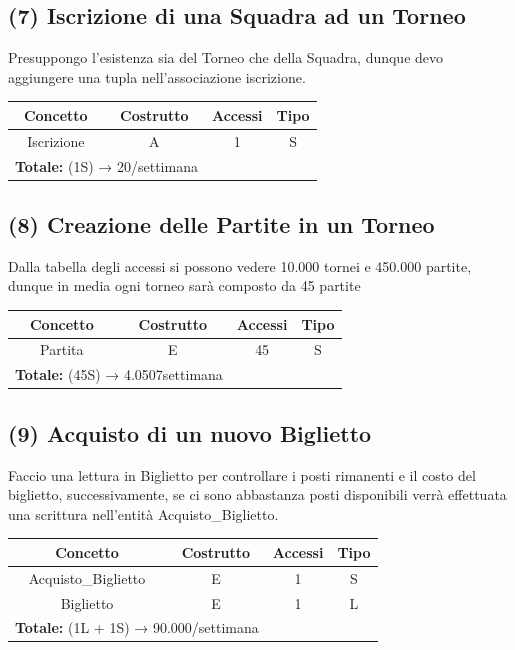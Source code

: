 \documentclass[a4paper,12pt]{report}
\begin{document}
\subsection*{(7) Iscrizione di una Squadra ad un Torneo}
Presuppongo l'esistenza sia del Torneo che della Squadra, dunque devo aggiungere una tupla nell'associazione iscrizione.
\begin{center}
	\begin{tabular}{|c|c|c|c|}
		\hline\rowcolor{pink}
		Concetto & Costrutto & Accessi & Tipo\\
		\hline\hline		
		Iscrizione  & A & 1 & S\\
		\hline
		\hline
		\multicolumn{2}{l}{%
			\textbf{Totale:}  (1S) → 20/settimana} \\
		\hline
	\end{tabular}
\end{center}
\subsection*{(8) Creazione delle Partite in un Torneo}
Dalla tabella degli accessi si possono vedere 10.000 tornei e 450.000 partite, dunque in media ogni torneo sarà composto da 45 partite
\begin{center}
	\begin{tabular}{|c|c|c|c|}
		\hline\rowcolor{pink}
		Concetto & Costrutto & Accessi & Tipo\\
		\hline\hline		
		Partita & E & 45 & S\\
		\hline
		\hline
		\multicolumn{2}{l}{%
			\textbf{Totale:} (45S)  → 4.0507settimana} \\
		\hline
	\end{tabular}
\end{center}
\subsection*{(9) Acquisto di un nuovo Biglietto}
Faccio una lettura in Biglietto per controllare i posti rimanenti e il costo del biglietto, successivamente, se ci sono abbastanza posti disponibili verrà effettuata una scrittura nell'entità Acquisto\_Biglietto.
\begin{center}
	\begin{tabular}{|c|c|c|c|}
		\hline\rowcolor{pink}
		Concetto & Costrutto & Accessi & Tipo\\
		\hline\hline		
		Acquisto\_Biglietto & E & 1 & S\\
		\hline
		Biglietto & E & 1 & L\\
		\hline
		\multicolumn{2}{l}{%
			\textbf{Totale:} (1L + 1S) → 90.000/settimana} \\
		\hline
	\end{tabular}
\end{center}
\end{document}
